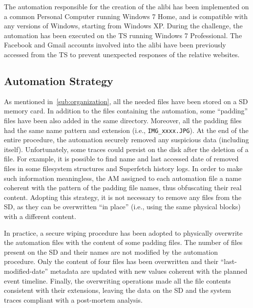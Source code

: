 \documentclass[10pt, conference]{IEEEtran}
\begin{document}
The automation responsible for the creation of the alibi has been implemented on a common Personal Computer running
Windows 7 Home, and is compatible with any versions of  Windows, starting from Windows XP. During the challenge,
the automation has been executed on the TS running Windows 7 Professional. 
The Facebook and Gmail accounts involved into the alibi have been previously accessed from the TS to prevent unexpected
responses of the relative websites.


\subsection{Automation Strategy} As mentioned in~\ref{sub:organization}, all the needed files have been stored on a SD memory card.
In addition to the files containing the automation, some ``padding'' files have been also added in the same directory. Moreover, all the
padding files had the same name pattern and extension (i.e., \verb=IMG_xxxx.JPG=). At the end of the entire procedure,
the automation securely removed any suspicious data (including itself). 
Unfortunately, some traces could persist on the disk after the deletion of a file. For example,
it is possible to find name and last accessed date of removed files in some filesystem structures and Superfetch history logs.
In order to make such information meaningless, the AM assigned to each automation file a name coherent with the pattern of the
padding file names, thus obfuscating their real content. Adopting this strategy, it is not necessary to remove any files from the
SD, as they can be overwritten ``in place'' (i.e., using the same physical blocks) with a different content.

In practice, a secure wiping procedure has been adopted to physically overwrite the automation files with the content of some
padding files. The number of files present on the SD and their names are not modified by the automation procedure. Only
the content of four files has been overwritten and their ``last-modified-date'' metadata are updated with new values coherent with
the planned event timeline. Finally, the overwriting operations made all the file contents consistent with their extensions, leaving the data on the SD and the system traces compliant with a post-mortem analysis.

\end{document}
